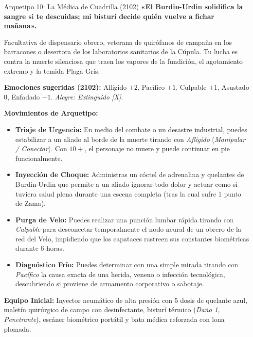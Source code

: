 \begin{FichaArquetipo}{Arquetipo 10: La Médica de Cuadrilla (2102)}
\textbf{«El Burdin-Urdin solidifica la sangre si te descuidas; mi bisturí decide quién vuelve a fichar mañana».}

Facultativa de dispensario obrero, veterana de quirófanos de campaña en los barracones o desertora de los laboratorios sanitarios de la Cúpula. Tu lucha es contra la muerte silenciosa que traen los vapores de la fundición, el agotamiento extremo y la temida Plaga Gris.

\textbf{Emociones sugeridas (2102):} Afligido $+2$, Pacífico $+1$, Culpable $+1$, Asustado $0$, Enfadado $-1$. \textit{Alegre: Extinguido [X]}.

\textbf{Movimientos de Arquetipo:}
\begin{itemize}
    \item \textbf{Triaje de Urgencia:} En medio del combate o un desastre industrial, puedes estabilizar a un aliado al borde de la muerte tirando con \textit{Afligido} (\textit{Manipular / Conectar}). Con $10+$, el personaje no muere y puede continuar en pie funcionalmente.
    \item \textbf{Inyección de Choque:} Administras un cóctel de adrenalina y quelantes de Burdin-Urdin que permite a un aliado ignorar todo dolor y actuar como si tuviera salud plena durante una escena completa (tras la cual sufre 1 punto de Zama).
    \item \textbf{Purga de Velo:} Puedes realizar una punción lumbar rápida tirando con \textit{Culpable} para desconectar temporalmente el nodo neural de un obrero de la red del Velo, impidiendo que los capataces rastreen sus constantes biométricas durante 6 horas.
    \item \textbf{Diagnóstico Frío:} Puedes determinar con una simple mirada tirando con \textit{Pacífico} la causa exacta de una herida, veneno o infección tecnológica, descubriendo si proviene de armamento corporativo o sabotaje.
\end{itemize}

\textbf{Equipo Inicial:} Inyector neumático de alta presión con 5 dosis de quelante azul, maletín quirúrgico de campo con desinfectante, bisturí térmico (\textit{Daño 1, Penetrante}), escáner biométrico portátil y bata médica reforzada con lona plomada.
\end{FichaArquetipo}
